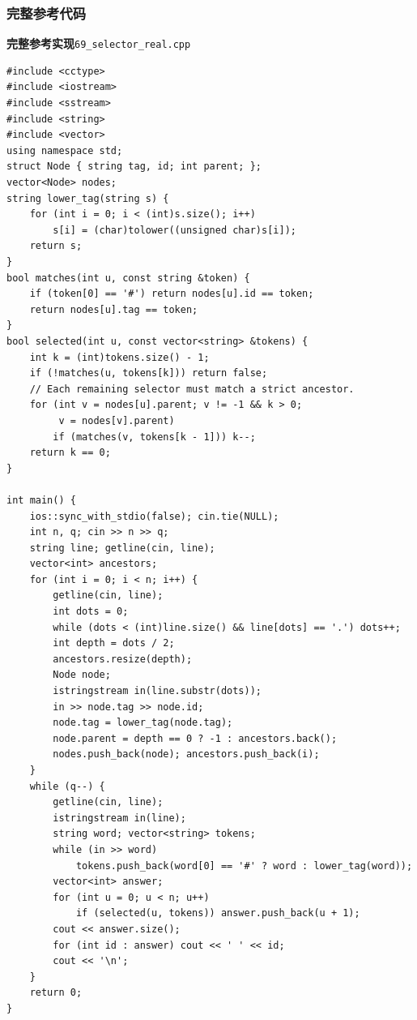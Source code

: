 \documentclass[UTF8,11pt,a4paper,fontset=none]{ctexart}
\begin{document}
\subsubsection{完整参考代码}
\par\noindent\begin{minipage}{\linewidth}
\textbf{完整参考实现}\quad\texttt{69\_selector\_real.cpp}
\begin{lstlisting}
#include <cctype>
#include <iostream>
#include <sstream>
#include <string>
#include <vector>
using namespace std;
struct Node { string tag, id; int parent; };
vector<Node> nodes;
string lower_tag(string s) {
    for (int i = 0; i < (int)s.size(); i++)
        s[i] = (char)tolower((unsigned char)s[i]);
    return s;
}
bool matches(int u, const string &token) {
    if (token[0] == '#') return nodes[u].id == token;
    return nodes[u].tag == token;
}
bool selected(int u, const vector<string> &tokens) {
    int k = (int)tokens.size() - 1;
    if (!matches(u, tokens[k])) return false;
    // Each remaining selector must match a strict ancestor.
    for (int v = nodes[u].parent; v != -1 && k > 0;
         v = nodes[v].parent)
        if (matches(v, tokens[k - 1])) k--;
    return k == 0;
}

int main() {
    ios::sync_with_stdio(false); cin.tie(NULL);
    int n, q; cin >> n >> q;
    string line; getline(cin, line);
    vector<int> ancestors;
    for (int i = 0; i < n; i++) {
        getline(cin, line);
        int dots = 0;
        while (dots < (int)line.size() && line[dots] == '.') dots++;
        int depth = dots / 2;
        ancestors.resize(depth);
        Node node;
        istringstream in(line.substr(dots));
        in >> node.tag >> node.id;
        node.tag = lower_tag(node.tag);
        node.parent = depth == 0 ? -1 : ancestors.back();
        nodes.push_back(node); ancestors.push_back(i);
    }
    while (q--) {
        getline(cin, line);
        istringstream in(line);
        string word; vector<string> tokens;
        while (in >> word)
            tokens.push_back(word[0] == '#' ? word : lower_tag(word));
        vector<int> answer;
        for (int u = 0; u < n; u++)
            if (selected(u, tokens)) answer.push_back(u + 1);
        cout << answer.size();
        for (int id : answer) cout << ' ' << id;
        cout << '\n';
    }
    return 0;
}
\end{lstlisting}
\end{minipage}\par
\end{document}
